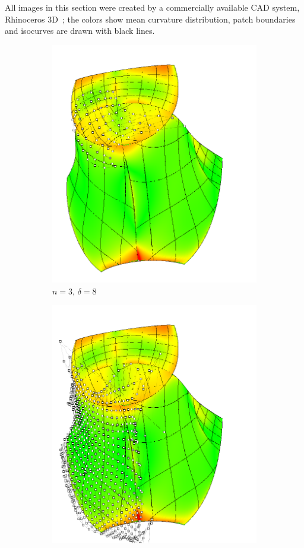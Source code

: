 \documentclass[9pt,academicons]{article}
\begin{document}
All images in this section were created by a commercially available CAD system,
Rhinoceros 3D~\cite{Rhino3D}; the colors show mean curvature distribution,
patch boundaries and isocurves are drawn with black lines.

\begin{figure}[!ht]
  {
    \hfill
    \begin{subfigure}{.3\textwidth}
      \centering
      \includegraphics[width=.9\textwidth]{images/cagd86/spatch3.png}
      \caption{$n=3$, $\delta=8$}
      \label{fig:cagd86-3-sp}
    \end{subfigure}
    \hfill
    \begin{subfigure}{.3\textwidth}
      \centering
      \includegraphics[width=.9\textwidth]{images/cagd86/spatch2.png}

\end{subfigure}}
\end{figure}
\end{document}
